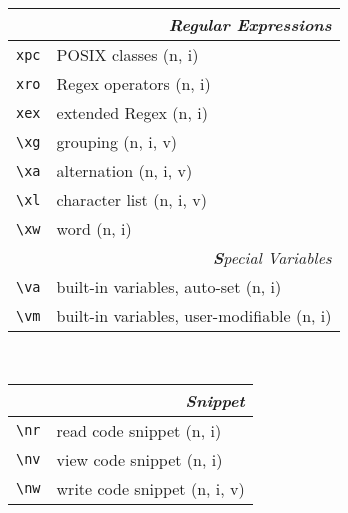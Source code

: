 \documentclass[oneside,10pt,landscape,DIV16]{scrartcl}
\begin{document}
\begin{multicols}{3}
\begin{center}
\begin{tabular}[]{|p{11mm}|p{60mm}|}
\hline
\hline
\multicolumn{2}{|r|}{\textsl{Regular E\textbf{x}pressions}}     \\[1.0ex]
\hline     \verb'xpc' &  POSIX classes                 \hfill (n, i)\\ 
\hline     \verb'xro' &  Regex operators               \hfill (n, i)\\ 
\hline     \verb'xex' &  extended Regex                \hfill (n, i)\\ 
\hline     \verb'\xg' &  grouping                      \hfill (n, i, v)   \\
\hline     \verb'\xa' &  alternation                   \hfill (n, i, v)   \\
\hline     \verb'\xl' &  character list                \hfill (n, i, v)   \\
\hline     \verb'\xw' &  word                          \hfill (n, i)   \\
\hline
\hline
\multicolumn{2}{|r|}{\textsl{\textbf{S}pecial Variables}}            \\[1.0ex]
\hline \verb'\va'   & built-in variables, auto-set        \hfill (n, i)\\
\hline \verb'\vm'   & built-in variables, user-modifiable \hfill (n, i)\\
\hline
%
\end{tabular}\\
%
%
\begin{tabular}[]{|p{11mm}|p{62mm}|}
\hline
\multicolumn{2}{|r|}{\textsl{S\textbf{n}ippet}}                \\[1.0ex]
\hline \verb'\nr'  & read code snippet         \hfill (n, i)   \\
\hline \verb'\nv'  & view code snippet         \hfill (n, i)   \\
\hline \verb'\nw'  & write code snippet        \hfill (n, i, v)\\

\end{tabular}
\end{center}
\end{multicols}
\end{document}
